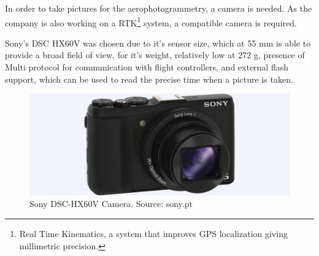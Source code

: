 In order to take pictures for the aerophotogrammetry, a camera is needed. As the company is also working on a RTK\footnote{Real Time Kinematics, a system that improves GPS localization giving millimetric precision.} system, a compatible camera is required.

Sony's DSC HX60V was chosen due to it's sensor size, which at 55 mm is able to provide a broad field of view, for it's weight, relatively low at 272 g, presence of Multi protocol for communication with flight controllers, and external flash support, which can be used to read the precise time when a picture is taken.

\begin{figure}[H]
\centering
  \includegraphics[width=0.8\linewidth]{figs/camera.jpg}
  \caption{Sony DSC-HX60V Camera. Source: sony.pt}
  \label{fig:camera}
\end{figure}



